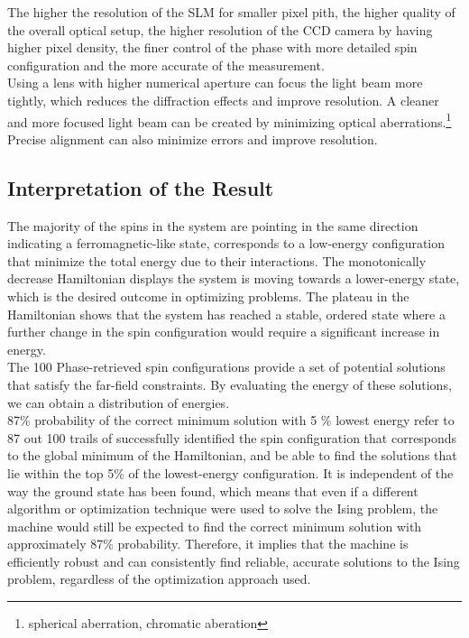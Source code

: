 The higher the resolution of the SLM for smaller pixel pith, the higher quality of the overall optical setup, the higher resolution of the CCD camera by having higher pixel density, the finer control of the phase with more detailed spin configuration and the more accurate of the measurement.\\

Using a lens with higher numerical aperture can focus the light beam more tightly, which reduces the diffraction effects and improve resolution. A cleaner and more focused light beam can be created by minimizing optical aberrations.\footnote{spherical aberration, chromatic aberation} Precise alignment can also minimize errors and improve resolution. 

\subsection{Interpretation of the Result}
The majority of the spins in the system are pointing in the same direction indicating a ferromagnetic-like state,  corresponds to a low-energy configuration that minimize the total energy due to their interactions. The monotonically decrease Hamiltonian displays the system is moving towards a lower-energy state, which is the desired outcome in optimizing problems. The plateau in the Hamiltonian shows that the system has reached a stable, ordered state where a further change in the spin configuration would require a significant increase in energy. \\

The 100 Phase-retrieved spin configurations provide a set of potential solutions that satisfy the far-field constraints. By evaluating the energy of these solutions, we can obtain a distribution of energies. \\

87\% probability of the correct minimum solution with 5 \% lowest energy refer to 87 out 100 trails of successfully identified the spin configuration that corresponds to the global minimum of the Hamiltonian, and be able to find the solutions that lie within the top 5\% of the lowest-energy configuration. It is independent of the way the ground state has been found, which means that even if a different algorithm or optimization technique were used to solve the Ising problem, the machine would still be expected to find the correct minimum solution with approximately 87\% probability. Therefore, it implies that the machine is efficiently robust and can consistently find reliable, accurate solutions to the Ising problem, regardless of the optimization approach used.\\

